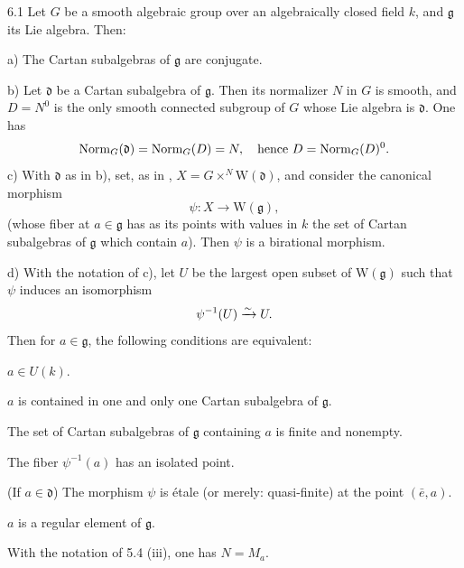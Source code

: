 \begin{theorem}{6.1}\label{XIII.6.1}
Let $G$ be a smooth algebraic group over an algebraically closed
field $k$, and $\mathfrak g$ its Lie algebra. Then:

\noindent a) The Cartan subalgebras of $\mathfrak g$ are conjugate.

\noindent b) Let $\mathfrak d$ be a Cartan subalgebra of
$\mathfrak g$. Then its normalizer $N$ in $G$ is smooth, and
$D=N^0$ is the only smooth connected subgroup of $G$ whose
Lie algebra is $\mathfrak d$. One has
\[
 \operatorname{Norm}_G(\mathfrak d)=\operatorname{Norm}_G(D)=N,
 \quad\text{hence }D=\operatorname{Norm}_G(D)^0.
\]
\noindent c) With $\mathfrak d$ as in b), set, as in ,
$X=G\times^N\mathrm W(\mathfrak d)$, and consider the
canonical morphism
\[
 \psi:X\to\mathrm W(\mathfrak g),
\]
(whose fiber at $a\in\mathfrak g$ has as its points with
values in $k$ the set of Cartan subalgebras of $\mathfrak g$
which contain $a$). Then $\psi$ is a birational morphism.

\noindent d) With the notation of c), let $U$ be the largest
open subset of $\mathrm W(\mathfrak g)$ such that $\psi$
induces an isomorphism
\[
 \psi^{-1}(U)\xrightarrow{\sim} U.
\]
Then for $a\in\mathfrak g$, the following conditions are equivalent:
\begin{enumeratei}
\item $a\in U(k)$.
\item $a$ is contained in one and only one Cartan subalgebra
of $\mathfrak g$.
\item The set of Cartan subalgebras of $\mathfrak g$ containing
$a$ is finite and nonempty.
\item The fiber $\psi^{-1}(a)$ has an isolated point.
\item (If $a\in\mathfrak d$) The morphism $\psi$ is \'etale
(or merely: quasi-finite) at the point $(\bar e,a)$.
\item $a$ is a regular element of $\mathfrak g$.
\item With the notation of 5.4 (iii), one has $N=M_a$.
\end{enumeratei}
\end{theorem}
